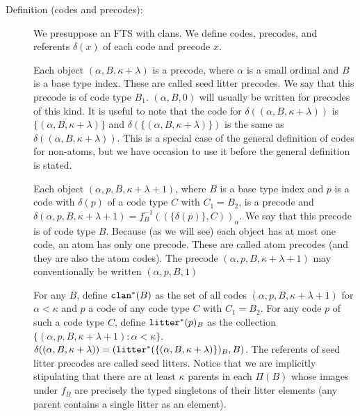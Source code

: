 \documentclass{article}
\begin{document}
\begin{description}

\item[Definition (codes and precodes):]

We presuppose an FTS with clans.  We define codes, precodes, and referents $\delta(x)$ of each code and precode $x$.

Each object $(\alpha,B,\kappa+\lambda)$ is a precode, where $\alpha$ is a small ordinal and $B$ is a base type index.   These are called seed litter precodes.  We say that this precode is of code type $B_1$.  $(\alpha,B,0)$  will usually be written for precodes of this kind.  It is useful to note that the code for $\delta((\alpha,B,\kappa+\lambda))$ is $\{(\alpha,B,\kappa+\lambda)\}$
and $\delta(\{(\alpha,B,\kappa+\lambda)\})$ is the same as $\delta((\alpha,B,\kappa+\lambda))$.   This is a special case of the general definition of codes for non-atoms, but we have occasion to use it before the general definition is stated.

Each object $(\alpha,p,B,\kappa+\lambda+1)$, where $B$ is a base type index and $p$ is a code with $\delta(p)$ of a code type $C$ with $C_1=B_2$, is a precode and $\delta(\alpha,p,B,\kappa+\lambda+1)=f_B^{-1}((\{\delta(p)\},C))_{\alpha}$.  We say that this precode is of code type $B$.  Because (as we will see) each object has at most one code, an atom has only one precode.  These are called atom precodes (and they are also the atom codes).  The precode $(\alpha,p,B,\kappa+\lambda+1)$ may conventionally be written $(\alpha,p,B,1)$

For any $B$, define ${\tt clan}^*(B)$ as the set of all codes $(\alpha,p,B,\kappa+\lambda+1)$ for $\alpha<\kappa$ and $p$ a code of any code type $C$ with $C_1=B_2$.
For any code $p$ of such a code type $C$, define ${\tt litter}^*(p)_B$ as the collection $\{(\alpha,p,B,\kappa+\lambda+1):\alpha<\kappa\}$.
$\delta((\alpha,B,\kappa+\lambda)) = ({\tt litter}^*(\{(\alpha,B,\kappa+\lambda)\})_B,B)$.   The referents of seed litter precodes are called seed litters.  Notice that we are implicitly stipulating that there are at least $\kappa$ parents in each $\Pi(B)$ whose images under $f_B$ are precisely the typed singletons of their litter elements (any parent contains a single litter as an element).


\end{description}
\end{document}
